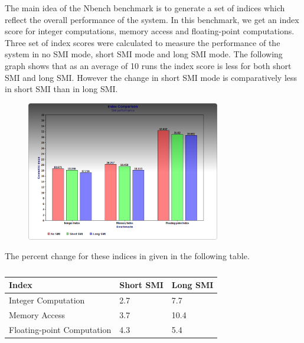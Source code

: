 \documentclass{IEEEtran}
\begin{document}


The main idea of the Nbench benchmark is to generate a set of indices which reflect the overall performance of the system. In this benchmark, we get an index score for integer     computations, memory access and floating-point computations. Three set of index scores were calculated to measure the performance of the system in no SMI mode, short SMI mode and long SMI mode. The following graph shows that as an average of 10 runs the index score is less for both short SMI and long SMI. However the change in short SMI mode is comparatively less in short SMI than in long SMI.

\begin{figure}[H]
\includegraphics[keepaspectratio=true,width=240pt]{vj_graph3.png}
\caption{ }
\end{figure}

The percent change for these indices in given in the following table.

\begin{table}[h]
            \caption{ }
\begin{tabular}{lll}
\hline
Index                      & Short SMI & Long SMI \\ \hline
Integer Computation        & 2.7       & 7.7      \\
            Memory Access              & 3.7       & 10.4     \\
            Floating-point Computation & 4.3       & 5.4      \\ \hline
            \end{tabular}
            \end{table}
\end{document}
